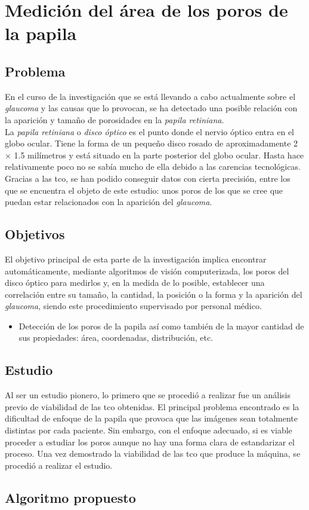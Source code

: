 \chapter{Medición del área de los poros de la papila}
\section{Problema}
En el curso de la investigación que se está llevando a cabo
actualmente sobre el \emph{glaucoma} y las causas que lo provocan, se
ha detectado una posible relación con la aparición y tamaño de
porosidades en la \emph{papila retiniana}. \\
La \emph{papila retiniana} o \emph{disco óptico} es el punto donde el
nervio óptico entra en el globo ocular. Tiene la forma de un pequeño
disco rosado de aproximadamente 2 $\times$ 1.5 milímetros y está
situado en la parte posterior del globo ocular. Hasta hace
relativamente poco no se sabía mucho de ella debido a las carencias
tecnológicas. Gracias a las \gls{tco}, se han podido conseguir datos
con cierta precisión, entre los que se encuentra el objeto de este
estudio: unos poros de los que se cree que puedan estar
relacionados con la aparición del \emph{glaucoma}.\\

\section{Objetivos}
El objetivo principal de esta parte de la investigación implica
encontrar automáticamente, mediante algoritmos de visión
computerizada, los poros del disco óptico para medirlos y, en la
medida de lo posible, establecer una correlación entre su tamaño, la
cantidad, la posición o la forma y la aparición del \emph{glaucoma},
siendo este procedimiento supervisado por personal médico.
\begin{itemize}
\item Detección de los poros de la papila así como también de la mayor
  cantidad de sus propiedades: área, coordenadas, distribución, etc.
\end{itemize}

\section{Estudio}
Al ser un estudio pionero, lo primero que se procedió a realizar fue un
análisis previo de viabilidad de las \gls{tco} obtenidas. El
principal problema encontrado es la dificultad de enfoque de la papila
que provoca que las imágenes sean totalmente distintas por cada paciente. Sin
embargo, con el enfoque adecuado, si es viable proceder a estudiar los
poros aunque no hay una forma clara de estandarizar el proceso. Una
vez demostrado la viabilidad de las \gls{tco} que produce la máquina,
se procedió a realizar el estudio.
\section{Algoritmo propuesto}
